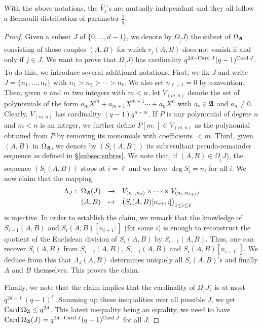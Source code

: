 \documentclass{article}
\begin{document}
\begin{prop}
\label{prop:distribk}
With the above notations, the $\bar V_j$'s are mutually independant
and they all follow a Bernoulli distribution of parameter $\frac 1 q$.
\end{prop}

\begin{proof} 
Given a subset $J$ of $\{0, \ldots, d-1\}$, we denote by 
$\Omega_\ring(J)$ the subset of $\Omega_\mathfrak A$ consisting of those 
couples $(A,B)$ for which $r_j(A,B)$ does not vanish if and only if $j 
\in J$. We want to prove that $\Omega_\ring(J)$ has cardinality 
$q^{2d-\text{\rm Card}\: J} (q-1)^{\text{\rm Card}\: J}$. To do this, we introduce several 
additional notations. First, we fix $J$ and write $J = \{n_1, \ldots, 
n_\ell\}$ with $n_1 > n_2 > \cdots > n_\ell$. We also set $n_{\ell+1} = 
0$ by convention. Then, given $n$ and $m$ two integers with $m < n$, let 
$V_{(m,n)}$ denote the set of polynomials of the form
$a_m X^m + a_{m+1} X^{m+1} \cdots + a_n X^n$
with $a_i \in \mathfrak A$ and $a_n \neq 0$. Clearly, $V_{(m,n)}$ has
cardinality $(q-1) q^{n-m}$. If $P$ is any polynomial of 
degree $n$ and $m < n$ is an integer, we further define $P[m{:}] \in 
V_{(m,n)}$ as the polynomial obtained from $P$ by removing its monomials 
with coefficients $< m$. Third, given $(A,B)$ in $\Omega_\mathfrak A$, we 
denote by $(S_i(A,B))$ its subresultant pseudo-remainder sequence as 
defined in \S \ref{subsec:subres}. We note that, if $(A,B) \in 
\Omega_\ring(J)$, the sequence $(S_i(A,B))$ stops at $i = \ell$ and we 
have $\deg S_i = n_i$ for all $i$. We now claim that the mapping
$$\begin{array}{rcl} 
\Lambda_J : \,\, 
\Omega_\ring(J) & \to & 
V_{(n_1,n_2)} \times \cdots \times V_{(n_\ell,n_{\ell+1})} \smallskip \\
(A,B) & \mapsto & 
\big(S_i(A,B)[n_{i+1}{:}]\big)_{1 \leq i \leq \ell}
\end{array}$$ 
is injective. In order to establish the claim, we remark that the 
knowledge of $S_{i-1}(A,B)$ and $S_i(A,B)[n_{i+1}{:}]$ (for some $i$) 
is enough to reconstruct the quotient of the Euclidean division of 
$S_i(A,B)$ by $S_{i-1}(A,B)$. Thus, one can recover $S_i(A,B)$ from 
$S_{i-2}(A,B)$, $S_{i-1}(A,B)$ and $S_i(A,B)[n_{i+1}{:}]$. We deduce 
from this that $\Lambda_J(A,B)$ determines uniquely all $S_i(A,B)$'s 
and finally $A$ and $B$ themselves. This proves the claim.

Finally, we note that the claim implies that the cardinality of 
$\Omega_\ring(J)$ is at most $q^{2d-\ell} (q-1)^\ell$. Summing up these 
inequalities over all possible $J$, we get $\text{\rm Card}\: \Omega_\mathfrak A \leq 
q^{2d}$. This latest inequality being an equality, we need to have
$\text{\rm Card}\: \Omega_\mathfrak A(J) = q^{2d-\text{\rm Card}\: J} (q-1)^{\text{\rm Card}\: J}$ for all $J$.
\end{proof}
\end{document}
